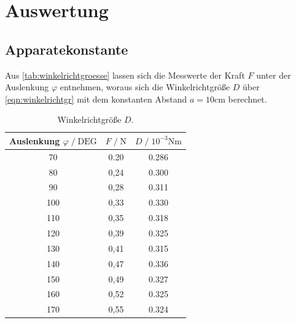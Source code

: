 \section{Auswertung}
\label{sec:Auswertung}



\subsection{Apparatekonstante}
\label{sec:Apparatekonstante}
Aus \autoref{tab:winkelrichtgroesse} lassen sich die Messwerte der Kraft $F$ unter der Auslenkung $\varphi$ entnehmen, woraus sich die
Winkelrichtgröße $D$ über \autoref{eqn:winkelrichtgr} mit dem konstanten Abstand $a= 10\si{\centi\meter}$ berechnet.


\begin{table}[H]
  \centering
  \caption{Winkelrichtgröße $D$.}
  \label{tab:winkelrichtgroesse}
  \begin{tabular}{c c c}
      \toprule
      Auslenkung $ \varphi \;/\; \text{DEG}$ & $F \;/\; \si{\newton}$ & $D \;/\; 10^{-3}\si{\newton\meter}$\\
      \midrule
      70 & 0.20 & 0.286 \\
      80 & 0,24 & 0.300 \\
      90 & 0,28 & 0.311 \\
      100 & 0,33 & 0.330 \\
      110 & 0,35 & 0.318 \\
      120 & 0,39 & 0.325 \\ 
      130 & 0,41 & 0.315 \\
      140 & 0,47 & 0.336 \\
      150 & 0,49 & 0.327 \\
      160 & 0,52 & 0.325 \\
      170 & 0,55 & 0.324 \\
      \bottomrule
  \end{tabular}
\end{table}

